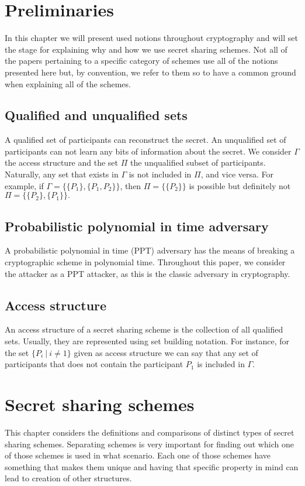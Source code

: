 \documentclass[12pt, a4paper, oneside]{book}
\begin{document}
    \chapter{Preliminaries}
    In this chapter we will present used notions throughout cryptography and will set the stage for explaining why and how we use secret sharing schemes. Not all of the papers pertaining to a specific category of schemes use all of the notions presented here but, by convention, we refer to them so to have a common ground when explaining all of the schemes.
    \section{Qualified and unqualified sets}
    A qualified set of participants can reconstruct the secret. An unqualified set of participants can not learn any bits of information about the secret.
    We consider $\Gamma$ the access structure and the set $\Pi$ the unqualified subset of participants. Naturally, any set that exists in $\Gamma$ is not included in $\Pi$, and vice versa. 
    For example, if $ \Gamma = \{ \{P_1\}, \{P_1, P_2\} \} $, then $ \Pi = \{ \{P_2\} \} $ is possible but definitely not $ \Pi = \{ \{P_2\}, \{P_1\} \}. $
    
    \section{Probabilistic polynomial in time adversary}
    A probabilistic polynomial in time (PPT) adversary has the means of breaking
    a cryptographic scheme in polynomial time. Throughout this paper, we
    consider the attacker as a PPT attacker, as this is the classic adversary in cryptography.
    
    \section{Access structure}
    An access structure of a secret sharing scheme is the collection of all qualified sets. Usually, they are represented using set building notation. For instance, for the set $\{P_i~|~   i{\neq1}\}$ given as access structure we can say that any set of participants that does not contain the participant $P_1$ is included in $ \Gamma $.
    
    \chapter{Secret sharing schemes}
    This chapter considers the definitions and comparisons of distinct types of secret sharing schemes. Separating schemes is very important for finding out which one of those schemes is used in what scenario. Each one of those schemes have something that makes them unique and having that specific property in mind can lead to creation of other structures. 
    
\end{document}
